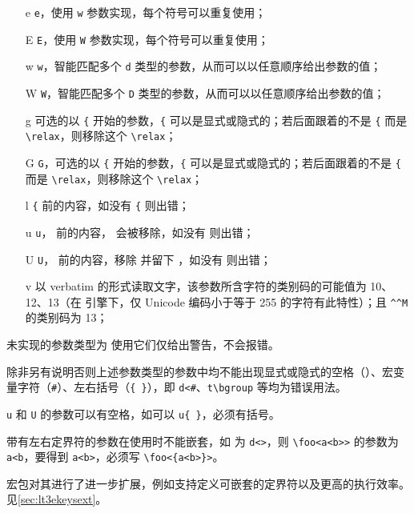 \documentclass{whudoc}
\begin{document}
{\begin{itemize}
  \item[\CCE e] \texttt e，使用 \texttt w 参数实现，每个符号可以重复使用；
  \item[\CCE E] \texttt E，使用 \texttt W 参数实现，每个符号可以重复使用；
  \item[\CCE w] \texttt w，智能匹配多个 \texttt d 类型的参数，从而可以以任意顺序给出参数的值；
  \item[\CCE W] \texttt W，智能匹配多个 \texttt D 类型的参数，从而可以以任意顺序给出参数的值；
  \item[\CCE g] 可选的以 \verb|{| 开始的参数，\verb|{| 可以是显式或隐式的；若后面跟着的不是 \verb|{| 而是 \verb|\relax|，则移除这个 \verb|\relax|；
  \item[\CCE G] \texttt G，可选的以 \verb|{| 开始的参数，\verb|{| 可以是显式或隐式的；若后面跟着的不是 \verb|{| 而是 \verb|\relax|，则移除这个 \verb|\relax|；
  \item[\CCS l] \verb|{| 前的内容，如没有 \verb|{| 则出错；
  \item[\CCS u] \texttt u， 前的内容， 会被移除，如没有  则出错；
  \item[\CCE U] \texttt U， 前的内容，移除  并留下 ，如没有  则出错；
  \item[\CCS v] 以 verbatim 的形式读取文字，该参数所含字符的类别码的可能值为 10、12、13（在 \pupTeX 引擎下，仅 Unicode 编码小于等于 255 的字符有此特性）；且 \texttt{\^{}\^{}M} 的类别码为 13；
\end{itemize}
}

未实现的参数类型为  使用它们仅给出警告，不会报错。

除非另有说明否则上述参数类型的参数中均不能出现显式或隐式的空格（\texttt\textvisiblespace）、宏变量字符（\texttt\#）、左右括号（\texttt{\{ \}}），即 \verb|d<#|、\verb|t\bgroup| 等均为错误用法。

\texttt u 和 \texttt U 的参数可以有空格，如可以 \verb|u{ }|，必须有括号。

带有左右定界符的参数在使用时不能嵌套，如  为 \verb|d<>|，则 \verb|\foo<a<b>>|
的参数为 \verb|a<b|，要得到 \verb|a<b>|，必须写 \verb|\foo<{a<b>}>|。

 宏包对其进行了进一步扩展，例如支持定义可嵌套的定界符以及更高的执行效率。见\cref{sec:lt3ekeysext}。
\end{document}
